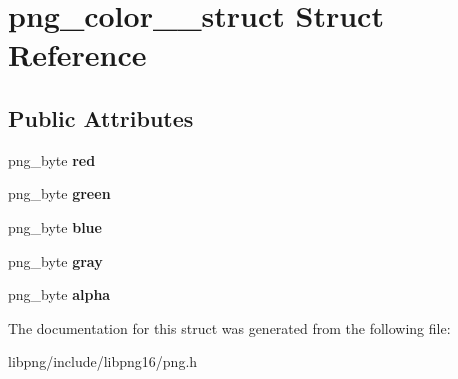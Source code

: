 \hypertarget{structpng__color__8__struct}{\section{png\-\_\-color\-\_\-\_\-struct Struct Reference}
\label{structpng__color__8__struct}
}
\subsection*{Public Attributes}
\begin{DoxyCompactItemize}
\item 
\hypertarget{structpng__color__8__struct_a5cd91bb4b3429256b84e6f28c72778b8}{png\-\_\-byte {\bfseries red}}\label{structpng__color__8__struct_a5cd91bb4b3429256b84e6f28c72778b8}

\item 
\hypertarget{structpng__color__8__struct_a40d053224177df35c037525b39563b05}{png\-\_\-byte {\bfseries green}}\label{structpng__color__8__struct_a40d053224177df35c037525b39563b05}

\item 
\hypertarget{structpng__color__8__struct_a58225d3b6426185d5a40d3c9935db96a}{png\-\_\-byte {\bfseries blue}}\label{structpng__color__8__struct_a58225d3b6426185d5a40d3c9935db96a}

\item 
\hypertarget{structpng__color__8__struct_a574edc173d956cca144927262e88653e}{png\-\_\-byte {\bfseries gray}}\label{structpng__color__8__struct_a574edc173d956cca144927262e88653e}

\item 
\hypertarget{structpng__color__8__struct_af1c7203aefe12bd35dc9a4cdd58e7a4b}{png\-\_\-byte {\bfseries alpha}}\label{structpng__color__8__struct_af1c7203aefe12bd35dc9a4cdd58e7a4b}

\end{DoxyCompactItemize}


The documentation for this struct was generated from the following file\-:\begin{DoxyCompactItemize}
\item 
libpng/include/libpng16/png.\-h\end{DoxyCompactItemize}
